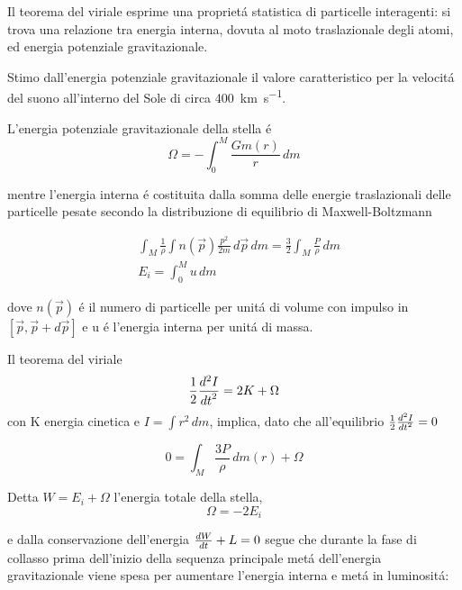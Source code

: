 \documentclass[../main.tex]{subfiles}
\begin{document}
Il teorema del viriale esprime una propriet\'a statistica di particelle interagenti: si trova una relazione tra energia interna, dovuta al moto traslazionale degli atomi, ed energia potenziale gravitazionale.


\begingroup
\color{grey}
Stimo dall'energia potenziale gravitazionale il valore caratteristico per la velocit\'a del suono all'interno del Sole di circa \SI{400}{\kilo\meter\per\second}.
\endgroup

L'energia potenziale gravitazionale della stella \'e
\begin{equation}
\Omega=-\int_0^M\frac{Gm(r)}{r}\,dm\label{eq:energiapg}
\end{equation}

mentre l'energia interna \'e costituita dalla somma delle energie traslazionali delle particelle pesate secondo la distribuzione di equilibrio di Maxwell-Boltzmann

\begin{align}
&\int_M\frac{1}{\rho}\int n(\vec{p})\frac{p^2}{2m}\,d\vec{p}\,dm=\frac{3}{2}\int_M\frac{P}{\rho}\,dm\\
&E_i=\int_0^Mu\,dm
\end{align}

dove $n(\vec{p})$ \'e il numero di particelle per unit\'a di volume con impulso in $[\vec{p},\vec{p}+d\vec{p}]$ e u \'e l'energia interna per unit\'a di massa.

Il teorema del viriale 
\begin{equation}
\frac{1}{2}\TtwoDy{t}{I}=2K+\Omega
\end{equation}
con K energia cinetica e $I=\int r^2\,dm$, implica, dato che all'equilibrio $\frac{1}{2}\TtwoDy{t}{I}=0$

\begin{equation}
0=\int_M\frac{3P}{\rho}\,dm(r)+\Omega
\end{equation}


Detta $W=E_i+\Omega$ l'energia totale della stella, 
\begin{equation}
\Omega=-2E_i\label{eq:virialegpm}
\end{equation}

e dalla conservazione dell'energia $\TDy{t}{W}+L=0$ segue che durante la fase di collasso prima dell'inizio della sequenza principale met\'a dell'energia gravitazionale viene spesa per aumentare l'energia interna e met\'a in luminosit\'a:
\end{document}
